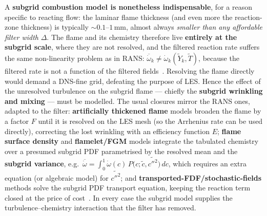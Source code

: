 {A \textbf{subgrid combustion model is nonetheless indispensable}, for a reason specific to reacting flow: the laminar flame thickness (and even more the reaction-zone thickness) is typically $\sim 0.1$--$1$\,mm, almost always \emph{smaller than any affordable filter width} $\Delta$. The flame and its chemistry therefore live \textbf{entirely at the subgrid scale}, where they are not resolved, and the filtered reaction rate suffers the same non-linearity problem as in RANS: $\overline{\dot\omega}_k \neq \dot\omega_k(\tilde Y_k,\tilde T)$, because the filtered rate is not a function of the filtered fields~\cite{lecture10}. Resolving the flame directly would demand a DNS-fine grid, defeating the purpose of LES. Hence the effect of the unresolved turbulence on the subgrid flame --- chiefly the \textbf{subgrid wrinkling and mixing} --- must be modelled. The usual closures mirror the RANS ones, adapted to the filter: \textbf{artificially thickened flame} models broaden the flame by a factor $F$ until it is resolved on the LES mesh (so the Arrhenius rate can be used directly), correcting the lost wrinkling with an efficiency function $E$; \textbf{flame surface density} and \textbf{flamelet/FGM} models integrate the tabulated chemistry over a presumed subgrid PDF parametrised by the resolved mean and the \textbf{subgrid variance}, e.g.\ $\overline{\dot\omega} = \int_0^1 \dot\omega(c)\,P\!\big(c;\tilde c,\widetilde{c''^2}\big)\,dc$, which requires an extra equation (or algebraic model) for $\widetilde{c''^2}$; and \textbf{transported-FDF/stochastic-fields} methods solve the subgrid PDF transport equation, keeping the reaction term closed at the price of cost~\cite{lecture10,jones2014les}. In every case the subgrid model supplies the turbulence--chemistry interaction that the filter has removed.
}





